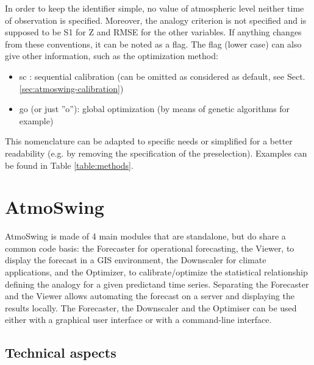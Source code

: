 \documentclass[review]{elsarticle}
\begin{document}
In order to keep the identifier simple, no value of atmospheric level neither time of observation is specified. Moreover, the analogy criterion is not specified and is supposed to be S1 for Z and RMSE for the other variables. If anything changes from these conventions, it can be noted as a flag. The flag (lower case) can also give other information, such as the optimization method:
\begin{itemize}
	\item sc : sequential calibration (can be omitted as considered as default, see Sect. \ref{sec:atmoswing-calibration})
	\item go (or just ''o''): global optimization (by means of genetic algorithms for example)
\end{itemize}

This nomenclature can be adapted to specific needs or simplified for a better readability (e.g. by removing the specification of the preselection). Examples can be found in Table \ref{table:methods}.


\section{AtmoSwing}
\label{sec:atmoswing}

AtmoSwing is made of 4 main modules that are standalone, but do share a common code basis: the Forecaster for operational forecasting, the Viewer, to display the forecast in a GIS environment, the Downscaler for climate applications, and the Optimizer, to calibrate/optimize the statistical relationship defining the analogy for a given predictand time series. Separating the Forecaster and the Viewer allows automating the forecast on a server and displaying the results locally. The Forecaster, the Downscaler and the Optimiser can be used either with a graphical user interface or with a command-line interface.


\subsection{Technical aspects}
\end{document}
